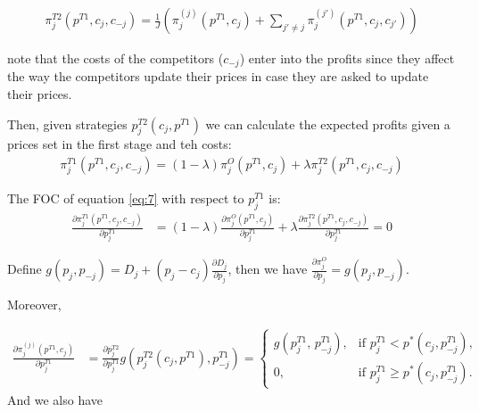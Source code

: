 \documentclass[12pt]{article}
\begin{document}
\begin{align}\label{eq:profits_external2} %
    \pi_j^{T2}(p^{T1}, c_j, c_{-j}) =  \frac{1}{J} \left( \pi_j^{(j)}(p^{T1}, c_j)   + \sum_{j'\neq j} \pi_j^{(j')}(p^{T1}, c_j, c_{j'}) \right)
\end{align}


note that the costs of the competitors ($c_{-j}$) enter into the profits since they affect the way the competitors update their prices in case they are asked to update their prices.

Then, given strategies  $p_j^{T2}(c_j, p^{T1})$ we can calculate the expected profits given a prices set in the first stage and teh costs: 
\begin{align}\label{eq:7} %
    \pi_j^{T1}(p^{T1}, c_j, c_{-j}) = (1-\lambda) \pi_j^O(p^{T1}, c_j) + \lambda \pi_j^{T2}(p^{T1}, c_j, c_{-j})
\end{align}


The FOC of equation \ref{eq:7} with respect to $p_j^{T1}$ is:
\begin{align}
    \frac{\partial \pi_j^{T1}(p^{T1}, c_j, c_{-j})}{\partial p_j^{T1}} &= (1-\lambda) \frac{\partial \pi_j^O(p^{T1}, c_j)}{\partial p_j^{T1}} + \lambda \frac{\partial \pi_j^{T2}(p^{T1}, c_j, c_{-j})}{\partial p_j^{T1}} = 0   
\end{align}


Define $g(p_j, p_{-j}) =  D_j + (p_j - c_j) \frac{\partial D_j}{\partial p_j}$, then we have $     \frac{\partial \pi_j^{O}}{\partial p_j} =  g(p_j, p_{-j}) $. 

Moreover,

\begin{align}\label{eq:asking_j} %
    \frac{\partial \pi_j^{(j)}(p^{T1}, c_j) }{\partial p_j^{T1} } 
    & = \frac{\partial p_j^{T2}}{\partial p_j^{T1} } g(p_j^{T2}(c_j, p^{T1}), p_{-j}^{T1}) =
    \begin{cases}
    g\!\left(p_j^{T1},\,p_{-j}^{T1}\right), & \text{if } p_j^{T1} < p^*(c_j, p_{-j}^{T1}),\\
    0, & \text{if } p_j^{T1} \ge p^*(c_j, p_{-j}^{T1}).
    \end{cases} 
\end{align}
And we also have 
\end{document}
